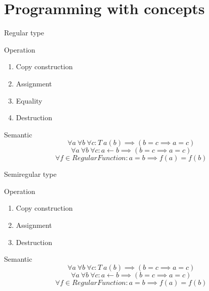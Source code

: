 \documentclass[10pt]{beamer}
\begin{document}
\section{Programming with concepts}
\begin{frame}{Regular type}
\begin{block}{Operation}
  \begin{enumerate}
    \item Copy construction
    \item Assignment
    \item Equality
    \item Destruction
  \end{enumerate}
\end{block}
\begin{block}{Semantic}
    $$\forall a ~ \forall b ~ \forall c : T~a(b)  \implies(b = c \implies a = c)$$
    $$\forall a ~ \forall b ~ \forall c : a \leftarrow b  \implies(b = c \implies a = c)$$
    $$\forall f \in RegularFunction: a = b \implies f(a) = f(b)$$
\end{block}
\end{frame}

\begin{frame}{Semiregular type}
\begin{block}{Operation}
  \begin{enumerate}
    \item Copy construction
    \item Assignment
    \item Destruction
  \end{enumerate}
\end{block}
\begin{block}{Semantic}
    $$\forall a ~ \forall b ~ \forall c : T~a(b)  \implies(b = c \implies a = c)$$
    $$\forall a ~ \forall b ~ \forall c : a \leftarrow b  \implies(b = c \implies a = c)$$
    $$\forall f \in RegularFunction: a = b \implies f(a) = f(b)$$
\end{block}
\end{frame}
\end{document}
